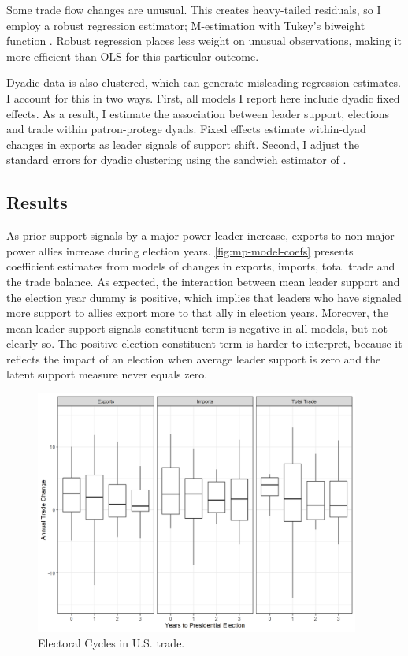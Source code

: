 \documentclass[12pt]{article}
\begin{document}
Some trade flow changes are unusual. 
This creates heavy-tailed residuals, so I employ a robust regression estimator; M-estimation with Tukey's biweight function \citep{RaineyBaissa2020}.
Robust regression places less weight on unusual observations, making it more efficient than OLS for this particular outcome.


Dyadic data is also clustered, which can generate misleading regression estimates.
I account for this in two ways. 
First, all models I report here include dyadic fixed effects.
As a result, I estimate the association between leader support, elections and trade within patron-protege dyads. 
Fixed effects estimate within-dyad changes in exports as leader signals of support shift.
Second, I adjust the standard errors for dyadic clustering using the sandwich estimator of \citep{Aronowetal2015}.




\subsection{Results}


As prior support signals by a major power leader increase, exports to non-major power allies increase during election years. 
\autoref{fig:mp-model-coefs} presents coefficient estimates from models of changes in exports, imports, total trade and the trade balance. 
As expected, the interaction between mean leader support and the election year dummy is positive, which implies that leaders who have signaled more support to allies export more to that ally in election years. 
Moreover, the mean leader support signals constituent term is negative in all models, but not clearly so. 
The positive election constituent term is harder to interpret, because it reflects the impact of an election when average leader support is zero and the latent support measure never equals zero. 


\begin{figure}
\centering
\includegraphics[width=0.95\textwidth]{../figures/us-trade-cycles.png}
\caption{Electoral Cycles in U.S. trade.}
\label{fig:us-trade-cycles}
\end{figure}
\end{document}
